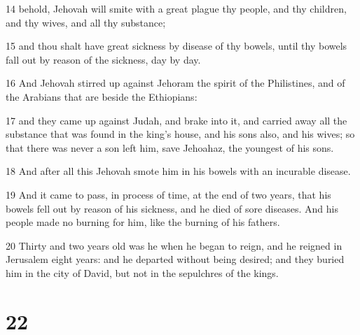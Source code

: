 \par 14 behold, Jehovah will smite with a great plague thy people, and thy children, and thy wives, and all thy substance;
\par 15 and thou shalt have great sickness by disease of thy bowels, until thy bowels fall out by reason of the sickness, day by day.
\par 16 And Jehovah stirred up against Jehoram the spirit of the Philistines, and of the Arabians that are beside the Ethiopians:
\par 17 and they came up against Judah, and brake into it, and carried away all the substance that was found in the king's house, and his sons also, and his wives; so that there was never a son left him, save Jehoahaz, the youngest of his sons.
\par 18 And after all this Jehovah smote him in his bowels with an incurable disease.
\par 19 And it came to pass, in process of time, at the end of two years, that his bowels fell out by reason of his sickness, and he died of sore diseases. And his people made no burning for him, like the burning of his fathers.
\par 20 Thirty and two years old was he when he began to reign, and he reigned in Jerusalem eight years: and he departed without being desired; and they buried him in the city of David, but not in the sepulchres of the kings.

\chapter{22}

